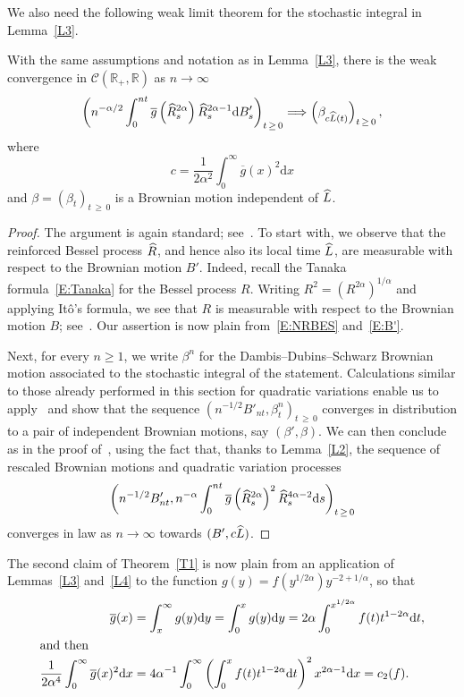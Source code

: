 \documentclass[AHL,Unicode,longabstracts,published]{cedram}
\renewcommand{\bar}[1]{\overline{#1}}
\renewcommand{\hat}[1]{\widehat{#1}}
\newcommand{\dd}{\mathrm{d}}
\newcommand{\R}{\mathbb{R}}
\newcommand{\calC}{\mathcal{C}}
\let\oldhat\hat
\renewcommand*{\hat}[1]{\mathchoice{\widehat{#1}}{\widehat{#1}}{\oldhat{#1}}{\oldhat{#1}}}
\begin{document}
We also need the following weak limit theorem for the stochastic integral in Lemma~\ref{L3}.

\begin{lemm}\label{L4}
With the same assumptions and notation as in Lemma~\ref{L3}, there
is the weak convergence in $\calC(\R_+,\R)$ as $n\to \infty$
\[
\left(n^{-\alpha/2} \int_0^{nt} \bar g\left(\hat R^{2\alpha}_s\right) \hat R_s^{2\alpha-1} \dd B'_s \right)_{t\,\geq\,0} \Longrightarrow \left(\beta_{c\hat{L}(t)}\right)_{t\,\geq\,0},
\]
where
\[
c= \frac{1}{2 \alpha^2}\int_0^{\infty} \bar g(x)^2 \dd x
\]
and $\beta = (\beta_t)_{t\,\geq\,0}$ is a Brownian motion independent of $\hat{L}$.
\end{lemm}

\begin{proof}
The argument is again standard; see~\cite[Section~XIII.2]{RY}. To start with, we observe that
the reinforced Bessel process $\hat R$, and hence also its local time $\hat{L}$, are measurable with respect to the Brownian motion $B'$. Indeed, recall the Tanaka formula~\eqref{E:Tanaka} for the Bessel process $R$. Writing $R^2=(R^{2\alpha})^{1/\alpha}$ and applying Itô's formula, we see that $R$ is measurable with respect to the Brownian motion $B$; see~\cite[p.~439]{RY}. Our assertion is now plain from~\eqref{E:NRBES} and~\eqref{E:B'}.

Next, for every $n\geq 1$, we write $\beta^n$ for the Dambis--Dubins--Schwarz Brownian motion associated to the stochastic integral of the statement. Calculations similar to those already performed in this section for quadratic variations enable us to apply~\cite[Theorem~XIII.2.3]{RY} and show that the sequence $ (n^{-1/2} B'_{nt}, \beta^n_t)_{t\,\geq\,0}$ converges in distribution to a pair of independent Brownian motions, say $(\beta',\beta)$. We can then conclude as in the proof of~\cite[Theorem~XIII.2.6]{RY}, using the fact that, thanks to Lemma~\ref{L2}, the sequence of rescaled Brownian motions and quadratic variation processes
\[
\left(n^{-1/2} B'_{nt}, n^{-\alpha} \int_0^{nt} \bar g\left(\hat R^{2\alpha}_s\right)^2 \hat R_s^{4\alpha-2} \dd s\right)_{t\,\geq\,0}
\]
converges in law as $n\to \infty$ towards $(B',c \hat{L})$.
\end{proof}

The second claim of Theorem~\ref{T1} is now plain from an application of Lemmas~\ref{L3} and~\ref{L4} to the function $g(y)=f(y^{1/2\alpha}) y^{-2+1/\alpha}$, so that
\begin{align*}
\bar g(x)&=\int_x^{\infty} g(y) \dd y =\int_0^x g(y) \dd y = 2\alpha \int_0^{x^{1/2\alpha}} f(t) t^{1-2\alpha} \dd t,
\\
\intertext{and then}
\frac{1}{2 \alpha^4}\int_0^{\infty} \bar g(x)^2 \dd x &=4\alpha^{-1} \int_0^{\infty} \left(\int_{0} ^{x} f(t) t^{1-2\alpha} \dd t \right)^2 x^{2\alpha-1}\dd x
= c_2(f).
\end{align*}
\end{document}
